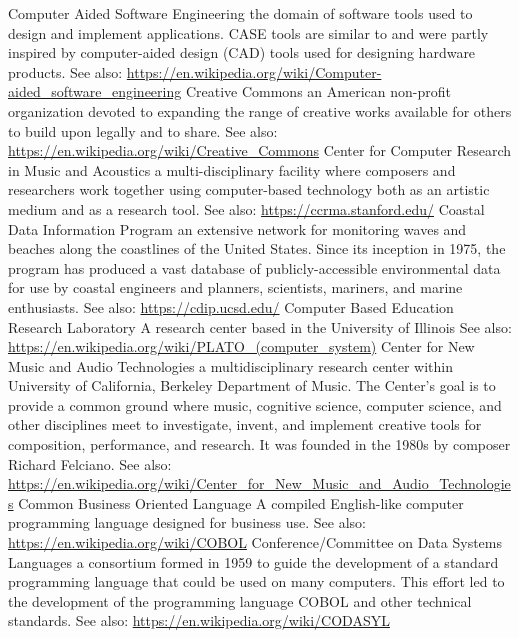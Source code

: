 	{Computer Aided Software Engineering}
	{the domain of software tools used to design and implement applications. CASE tools are similar to and were partly inspired by computer-aided design (CAD) tools used for designing hardware products. See also: \url{https://en.wikipedia.org/wiki/Computer-aided_software_engineering}}
	{Creative Commons}
	{an American non-profit organization devoted to expanding the range of creative works available for others to build upon legally and to share. See also: \url{https://en.wikipedia.org/wiki/Creative_Commons}}
	{Center for Computer Research in Music and Acoustics}
	{a multi-disciplinary facility where composers and researchers work together using computer-based technology both as an artistic medium and as a research tool. See also: \url{https://ccrma.stanford.edu/}}
	{Coastal Data Information Program}
	{an extensive network for monitoring waves and beaches along the coastlines of the United States. Since its inception in 1975, the program has produced a vast database of publicly-accessible environmental data for use by coastal engineers and planners, scientists, mariners, and marine enthusiasts.  See also: \url{https://cdip.ucsd.edu/}}
	{Computer Based Education Research Laboratory}
	{A research center based in the University of Illinois See also: \url{https://en.wikipedia.org/wiki/PLATO_(computer_system)}}
	{Center for New Music and Audio Technologies}
	{a multidisciplinary research center within University of California, Berkeley Department of Music. The Center's goal is to provide a common ground where music, cognitive science, computer science, and other disciplines meet to investigate, invent, and implement creative tools for composition, performance, and research. It was founded in the 1980s by composer Richard Felciano. See also: \url{https://en.wikipedia.org/wiki/Center_for_New_Music_and_Audio_Technologies}}
	{Common Business Oriented Language}
	{A compiled English-like computer programming language designed for business use. See also: \url{https://en.wikipedia.org/wiki/COBOL}}
	{Conference/Committee on Data Systems Languages}
	{a consortium formed in 1959 to guide the development of a standard programming language that could be used on many computers. This effort led to the development of the programming language COBOL and other technical standards. See also: \url{https://en.wikipedia.org/wiki/CODASYL}}
